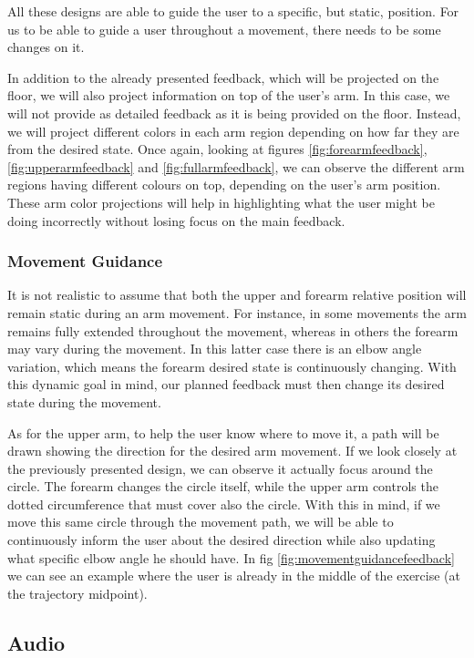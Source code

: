 All these designs are able to guide the user to a specific, but static, position. For us to be able to guide a user throughout a movement, there needs to be some changes on it.

In addition to the already presented feedback, which will be projected on the floor, we will also project information on top of the user's arm. 
In this case, we will not provide as detailed feedback as it is being provided on the floor. 
Instead, we will project different colors in each arm region depending on how far they are from the desired state. 
Once again, looking at figures \ref{fig:forearmfeedback}, \ref{fig:upperarmfeedback} and \ref{fig:fullarmfeedback}, we can observe the 
different arm regions having different colours on top, depending on the user's arm position.
These arm color projections will help in highlighting what the user might be doing incorrectly without losing focus on the main feedback.

\subsubsection{Movement Guidance}
\label{sec:movementguidance}

It is not realistic to assume that both the upper and forearm relative position will remain static during an arm movement. 
For instance, in some movements the arm remains fully extended throughout the movement, whereas in others the forearm may vary during the movement.  
In this latter case there is an elbow angle variation, which means the forearm desired state is continuously changing.
With this dynamic goal in mind, our planned feedback must then change its desired state during the movement.

As for the upper arm, to help the user know where to move it, a path will be drawn showing the direction for the desired arm movement.
If we look closely at the previously presented design, we can observe it actually focus around the circle. 
The forearm changes the circle itself, while the upper arm controls the dotted circumference that must cover also the circle. 
With this in mind, if we move this same circle through the movement path, we will be able to continuously inform the user about the 
desired direction while also updating what specific elbow angle he should have. 
In fig \ref{fig:movementguidancefeedback} we can see an example where the user is already in the middle of the exercise (at the trajectory midpoint).

\subsection{Audio}
\label{audio-feedback}

